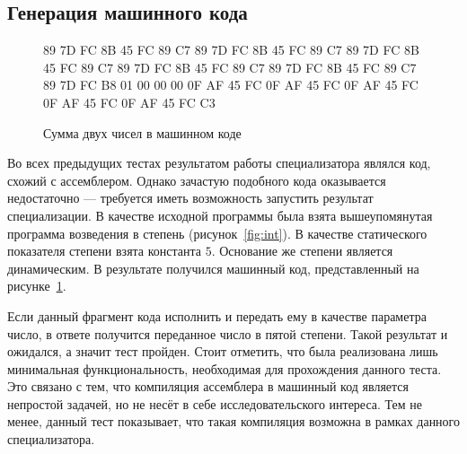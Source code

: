 \subsection{ Генерация машинного кода}
\begin{figure}
89 7D FC 8B 45 FC 89 C7 89 7D FC 8B 45 FC 89 C7 89 7D FC 8B 45 FC 89 C7 89 7D FC 8B 45 FC 89 C7 89 7D FC 8B 45 FC 89 C7 89 7D FC B8 01 00 00 00 0F AF 45 FC 0F AF 45 FC 0F AF 45 FC 0F AF 45 FC 0F AF 45 FC C3
\caption{ Сумма двух чисел в машинном коде}
\label{fig:pow}
\end{figure}
Во всех предыдущих тестах результатом работы специализатора являлся код, схожий с ассемблером. Однако зачастую подобного кода оказывается недостаточно --- требуется иметь возможность запустить результат специализации. В качестве исходной программы была взята вышеупомянутая программа возведения в степень (рисунок~\ref{fig:int}). В качестве статического показателя степени взята константа $5$. Основание же степени является динамическим. В результате получился машинный код, представленный на рисунке~\ref{fig:pow}.

Если данный фрагмент кода исполнить и передать ему в качестве параметра число, в ответе получится переданное число в пятой степени. Такой результат и ожидался, а значит тест пройден. Стоит отметить, что была реализована лишь минимальная функциональность, необходимая для прохождения данного теста. Это связано с тем, что компиляция ассемблера в машинный код является непростой задачей, но не несёт в себе исследовательского интереса. Тем не менее, данный тест показывает, что такая компиляция возможна в рамках данного специализатора.


